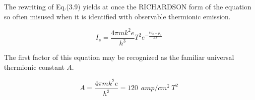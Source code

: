 \documentclass[11pt,a4paper]{article}
\begin{document}
	The rewriting of Eq.(3.9) yields at once the RICHARDSON form of the equation so often misused when it is identified with observable thermionic emission.
	
	\begin{equation}
		I_s = \frac{4\pi m k^2 e}{h^3} T^2 e^{-\frac{W_a - \mu_s}{kT}}
	\end{equation}

	The first factor of this equation may be recognized as the familiar universal
	thermionic constant $A$.
	
	\begin{equation}
		A = \frac{4\pi m k^2 e}{h^3} = 120 ~~ amp/cm^2~T^2
	\end{equation}
	
	
	\medskip
	
	\printbibliography
	
	
\end{document}
